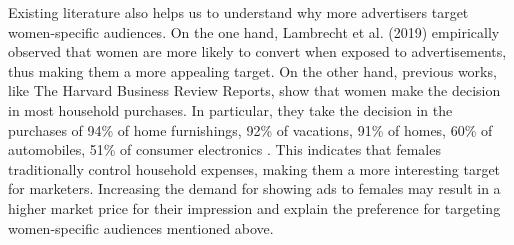 \documentclass[twocolumn]{bmcart}\usepackage{lineno}
\begin{document}
Existing literature also helps us to understand why more advertisers target women-specific audiences. On the one hand, Lambrecht et al. (2019) \cite{lambrecht2019algorithmic} empirically observed that women are more likely to convert when exposed to advertisements, thus making them a more appealing target. 
On the other hand, previous works, like The Harvard Business Review Reports, show that women make the decision in most household purchases. In particular, they take the decision in the purchases of 94\% of home furnishings, 92\% of vacations, 91\% of homes, 60\% of automobiles, 51\% of consumer electronics \cite{silverstein2009female}. This indicates that females traditionally control household expenses, making them a more interesting target for marketers. Increasing the demand for showing ads to females may result in a higher market price for their impression and explain the preference for targeting women-specific audiences mentioned above.
\end{document}
